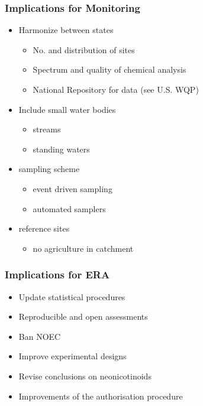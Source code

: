 \documentclass[
	12pt
	]{beamer}
\begin{document}
\begin{frame}
\frametitle{Implications for Monitoring}
	\begin{itemize}
    	\item Harmonize between states
	    	\begin{itemize}
		    	\item No. and distribution of sites
		    	\item Spectrum and quality of chemical analysis
		    	\item National Repository for data (see U.S. WQP)
		    \end{itemize}
	    \item Include small water bodies
		    \begin{itemize}
		    	\item streams
		    	\item standing waters
		    \end{itemize}
		\item sampling scheme
			\begin{itemize}
		    	\item event driven sampling
		    	\item automated samplers
		    \end{itemize}
		\item reference sites
			\begin{itemize}
		    	\item no agriculture in catchment
		    \end{itemize}
    \end{itemize}
\end{frame}


\begin{frame}
\frametitle{Implications for ERA}
	\begin{itemize}
    	\item Update statistical procedures
    	\item Reproducible and open assessments
    	\item Ban NOEC
    	\item Improve experimental designs
    	\item Revise conclusions on neonicotinoids
    	\item Improvements of the authorisation procedure
    \end{itemize}
\end{frame}
\end{document}
